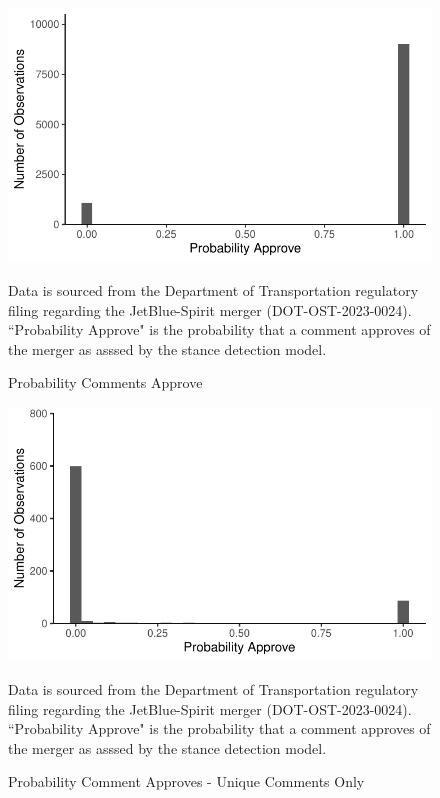 \documentclass{article}
\begin{document}
\begin{appendices}
	\begin{figure}
		\caption{Probability Comments Approve}
		\label{fig:ProbabilityApprove}
        \begin{center}
        \includegraphics{05.Figures/stance_strength_graph}
        \end{center}
		\begin{minipage}{\textwidth} 
			{\footnotesize Data is sourced from the Department of Transportation regulatory filing regarding the JetBlue-Spirit merger (DOT-OST-2023-0024). ``Probability Approve" is the probability that a comment approves of the merger as asssed by the stance detection model.} 
		\end{minipage}
	\end{figure}
	
	\begin{figure}
		\caption{Probability Comment Approves - Unique Comments Only}
		\label{fig:ProbabilityApprove_Unique}
        \begin{center}
            \includegraphics{05.Figures/stance_strength_unique.pdf}
        \end{center}
				\begin{minipage}{\textwidth} 
			{\footnotesize Data is sourced from the Department of Transportation regulatory filing regarding the JetBlue-Spirit merger (DOT-OST-2023-0024). ``Probability Approve" is the probability that a comment approves of the merger as asssed by the stance detection model.} 
		\end{minipage}
	\end{figure}



\end{appendices}
\end{document}
